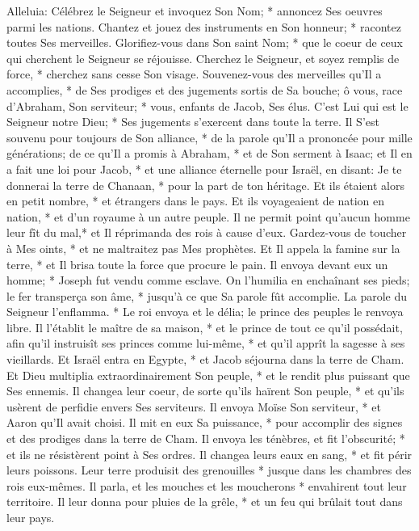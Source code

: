 Alleluia: Célébrez le Seigneur et invoquez Son Nom; * annoncez Ses oeuvres parmi les nations.
Chantez et jouez des instruments en Son honneur; * racontez toutes Ses merveilles.
Glorifiez-vous dans Son saint Nom; * que le coeur de ceux qui cherchent le Seigneur se réjouisse.
Cherchez le Seigneur, et soyez remplis de force, * cherchez sans cesse Son visage.
Souvenez-vous des merveilles qu'Il a accomplies, * de Ses prodiges et des jugements sortis de Sa bouche;
ô vous, race d'Abraham, Son serviteur; * vous, enfants de Jacob, Ses élus.
C'est Lui qui est le Seigneur notre Dieu; * Ses jugements s'exercent dans toute la terre.
Il S'est souvenu pour toujours de Son alliance, * de la parole qu'Il a prononcée pour mille générations;
de ce qu'Il a promis à Abraham, * et de Son serment à Isaac;
et Il en a fait une loi pour Jacob, * et une alliance éternelle pour Israël,
en disant: Je te donnerai la terre de Chanaan, * pour la part de ton héritage.
Et ils étaient alors en petit nombre, * et étrangers dans le pays.
Et ils voyageaient de nation en nation, * et d'un royaume à un autre peuple.
Il ne permit point qu'aucun homme leur fît du mal,* et Il réprimanda des rois à cause d'eux.
Gardez-vous de toucher à Mes oints, * et ne maltraitez pas Mes prophètes.
Et Il appela la famine sur la terre, * et Il brisa toute la force que procure le pain.
Il envoya devant eux un homme; * Joseph fut vendu comme esclave.
On l'humilia en enchaînant ses pieds; le fer transperça son âme, *
jusqu'à ce que Sa parole fût accomplie. La parole du Seigneur l'enflamma. *
Le roi envoya et le délia; le prince des peuples le renvoya libre.
Il l'établit le maître de sa maison, * et le prince de tout ce qu'il possédait,
afin qu'il instruisît ses princes comme lui-même, * et qu'il apprît la sagesse à ses vieillards.
Et Israël entra en Egypte, * et Jacob séjourna dans la terre de Cham.
Et Dieu multiplia extraordinairement Son peuple, * et le rendit plus puissant que Ses ennemis.
Il changea leur coeur, de sorte qu'ils haïrent Son peuple, * et qu'ils usèrent de perfidie envers Ses serviteurs.
Il envoya Moïse Son serviteur, * et Aaron qu'Il avait choisi.
Il mit en eux Sa puissance, * pour accomplir des signes et des prodiges dans la terre de Cham.
Il envoya les ténèbres, et fit l'obscurité; * et ils ne résistèrent point à Ses ordres.
Il changea leurs eaux en sang, * et fit périr leurs poissons.
Leur terre produisit des grenouilles * jusque dans les chambres des rois eux-mêmes.
Il parla, et les mouches et les moucherons * envahirent tout leur territoire.
Il leur donna pour pluies de la grêle, * et un feu qui brûlait tout dans leur pays.
